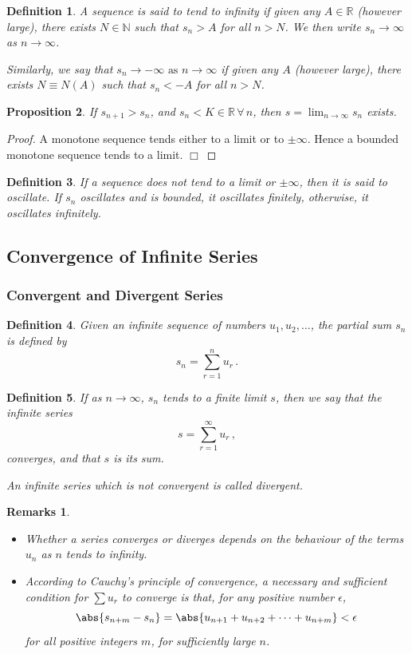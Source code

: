 \documentclass{article}
\theoremstyle{plain}\theoremheaderfont{\normalfont\itshape}\theorembodyfont{\rmfamily}\theoremseparator{.}\newtheorem*{rem}{Remark}\newtheorem*{ex}{Example}\newtheorem*{proof}{Proof}\newtheorem*{altp}{Alternative proof}
\theoremstyle{plain}\theoremheaderfont{\normalfont\bfseries}\theorembodyfont{\rmfamily}\theoremseparator{.}\newtheorem{thm}{Theorem}[section]\newtheorem{lem}[thm]{Lemma}\newtheorem{prop}[thm]{Proposition}\newtheorem*{cor}{Corollary}\newtheorem{defn}[thm]{Definition}\newtheorem{clm}[thm]{Claim}\newtheorem{clminproof}{Claim}
\theoremstyle{break}\theoremheaderfont{\normalfont\itshape}\theorembodyfont{\rmfamily}\theoremseparator{.\medskip}\newtheorem*{proofskip}{Proof}\newtheorem*{exs}{Examples}\newtheorem*{rems}{Remarks}
\theoremstyle{break}\theoremheaderfont{\normalfont\bfseries}\theorembodyfont{\rmfamily}\theoremseparator{.\medskip}\newtheorem{lemskip}[thm]{Lemma}\newtheorem{defnskip}[thm]{Definition}\newtheorem{propskip}[thm]{Proposition}\newtheorem{thmskip}[thm]{Theorem}
\numberwithin{equation}{section}
\newcommand{\qed}{\hfill\ensuremath{\Box}}
\begin{document}
	\begin{defn}
		A sequence is said to \textit{tend to infinity} if given any \(A\in\mathbb{R}\) (however large), there exists \(N\in\mathbb{N}\) such that \(s_n>A\) for all \(n>N\). We then write \(s_n\to\infty\) as \(n\to\infty\).

		Similarly, we say that \(s_n\to -\infty \text{ as }n\to\infty\) if given any \(A\) (however large), there exists \(N\equiv N(A)\) such that \(s_n<-A\) for all \(n>N\).
	\end{defn}
	\begin{prop}
		If \(s_{n+1}>s_n\), and \(s_n<K\in\mathbb{R}\,\forall\,n\), then \(s=\lim_{n\to\infty}s_n\) exists.
	\end{prop}
	\begin{proof}
		A monotone sequence tends either to a limit or to \(\pm\infty\). Hence a bounded monotone sequence tends to a limit. \qed
	\end{proof}
	\begin{defn}
		If a sequence does not tend to a limit or \(\pm\infty\), then it is said to \textit{oscillate}. If \(s_n\) oscillates and is bounded, it oscillates finitely, otherwise, it oscillates infinitely.
	\end{defn}
	\subsection{Convergence of Infinite Series}
	\subsubsection{Convergent and Divergent Series}
	\begin{defn}
		Given an infinite sequence of numbers \(u_1,u_2,\dots\), the \textit{partial sum} \(s_n\) is defined by
		\[s_n=\sum_{r=1}^{n}u_r\,.\]
	\end{defn}
	\begin{defn}
		If as \(n\to\infty\), \(s_n\) tends to a finite limit \(s\), then we say that the infinite series
		\[s=\sum_{r=1}^{\infty}u_r\,,\]
		\textit{converges}, and that \(s\) is its sum.

		An infinite series which is not \textit{convergent} is called \textit{divergent}.
	\end{defn}
	\begin{rems}
		\begin{itemize}[topsep=0pt]
			\item Whether a series converges or diverges depends on the behaviour of the terms \(u_n\) as \(n\) tends to infinity.
			\item According to Cauchy's principle of convergence, a necessary and sufficient condition for \(\sum u_r\) to converge is that, for any positive number \(\epsilon\),
			\[\abs{s_{n+m}-s_n}=\abs{u_{n+1}+u_{n+2}+\dots+u_{n+m}}<\epsilon\]
			for all positive integers \(m\), for sufficiently large \(n\).
		\end{itemize}
	\end{rems}
	
\end{document}
